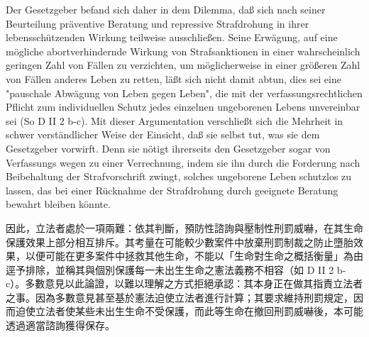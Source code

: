 \documentclass[12pt]{article}
\begin{document}
\syncleft
\begin{sourcepara}
Der Gesetzgeber befand sich daher in dem Dilemma, daß sich nach seiner Beurteilung präventive Beratung und repressive Strafdrohung in ihrer lebensschützenden Wirkung teilweise ausschließen. Seine Erwägung, auf eine mögliche abortverhindernde Wirkung von Strafsanktionen in einer wahrscheinlich geringen Zahl von Fällen zu verzichten, um möglicherweise in einer größeren Zahl von Fällen anderes Leben zu retten, läßt sich nicht damit abtun, dies sei eine "pauschale Abwägung von Leben gegen Leben", die mit der verfassungsrechtlichen Pflicht zum individuellen Schutz jedes einzelnen ungeborenen Lebens unvereinbar sei (So D II 2 b-c). Mit dieser Argumentation verschließt sich die Mehrheit in schwer verständlicher Weise der Einsicht, daß sie selbst tut, was sie dem Gesetzgeber vorwirft. Denn sie nötigt ihrerseits den Gesetzgeber sogar von Verfassungs wegen zu einer Verrechnung, indem sie ihn durch die Forderung nach Beibehaltung der Strafvorschrift zwingt, solches ungeborene Leben schutzlos zu lassen, das bei einer Rücknahme der Strafdrohung durch geeignete Beratung bewahrt bleiben könnte.
\end{sourcepara}
\begin{transpara}
因此，立法者處於一項兩難：依其判斷，預防性諮詢與壓制性刑罰威嚇，在其生命保護效果上部分相互排斥。其考量在可能較少數案件中放棄刑罰制裁之防止墮胎效果，以便可能在更多案件中拯救其他生命，不能以「生命對生命之概括衡量」為由逕予排除，並稱其與個別保護每一未出生生命之憲法義務不相容（如 D II 2 b-c）。多數意見以此論證，以難以理解之方式拒絕承認：其本身正在做其指責立法者之事。因為多數意見甚至基於憲法迫使立法者進行計算；其要求維持刑罰規定，因而迫使立法者使某些未出生生命不受保護，而此等生命在撤回刑罰威嚇後，本可能透過適當諮詢獲得保存。
\end{transpara}
\end{document}
